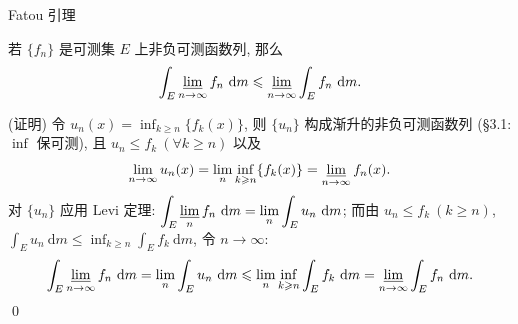 \begin{frame}{Fatou 引理}

\begin{thm}[Fatou 引理]
若 $\{f_n\}$ 是可测集 $E$ 上\alert{非负}可测函数列, 那么
\[
\int_E \varliminf_{n \to \infty} f_n ~ \mathrm{d} m
\leqslant
\varliminf_{n \to \infty} \int_E f_n ~ \mathrm{d} m .
\]
\end{thm}

\startproof[bg=yellow, fg=red](证明)
令 $u_n(x) = \inf_{k \geqslant n} \{ f_k(x) \}$, 则 $\{u_n\}$ 构成\alert{渐升}的非负可测函数列
(\S 3.1: $\inf$ 保可测), 且 $u_n \leqslant f_k\ (\forall k \geqslant n)$ 以及
\[
\lim_{n \to \infty} u_n(x) = \lim_{n} \inf_{k \geqslant n} \{ f_k(x) \} = \varliminf_{n \to \infty} f_n(x) .
\]
对 $\{u_n\}$ 应用 Levi 定理: $\displaystyle \int_E \varliminf_n f_n ~ \mathrm{d} m
= \lim_n \int_E u_n ~ \mathrm{d} m$; 而由 $u_n \leqslant f_k\ (k \geqslant n)$,
$\int_E u_n ~ \mathrm{d} m \leqslant \inf_{k \geqslant n} \int_E f_k ~ \mathrm{d} m$, 令 $n \to \infty$:
\[
\int_E \varliminf_{n \to \infty} f_n ~ \mathrm{d} m
= \lim_n \int_E u_n ~ \mathrm{d} m
\leqslant \lim_n \inf_{k \geqslant n} \int_E f_k ~ \mathrm{d} m
= \varliminf_{n \to \infty} \int_E f_n ~ \mathrm{d} m .
\]
\qed

\end{frame}


